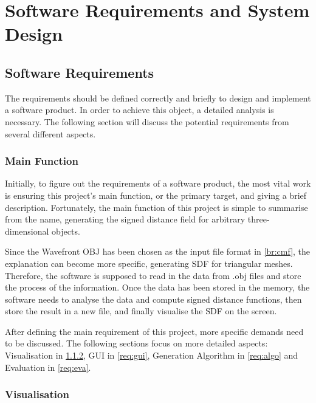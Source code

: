 \chapter{Software Requirements and System Design}

\section{Software Requirements}

The requirements should be defined correctly and briefly to design and implement a software product. In order to achieve this object, a detailed analysis is necessary. The following section will discuss the potential requirements from several different aspects.

\subsection{Main Function}
\label{req:main}

Initially, to figure out the requirements of a software product, the most vital work is ensuring this project's main function, or the primary target, and giving a brief description. Fortunately, the main function of this project is simple to summarise from the name, generating the signed distance field for arbitrary three-dimensional objects.

\hspace*{\fill}

Since the Wavefront OBJ has been chosen as the input file format in \ref{br:cmf}, the explanation can become more specific, generating SDF for triangular meshes. Therefore, the software is supposed to read in the data from .obj files and store the process of the information. Once the data has been stored in the memory, the software needs to analyse the data and compute signed distance functions, then store the result in a new file, and finally visualise the SDF on the screen.

\hspace*{\fill}

After defining the main requirement of this project, more specific demands need to be discussed. The following sections focus on more detailed aspects: Visualisation in \ref{req:visual}, GUI in \ref{req:gui}, Generation Algorithm in \ref{req:algo} and Evaluation in \ref{req:eva}.

\subsection{Visualisation}
\label{req:visual}

